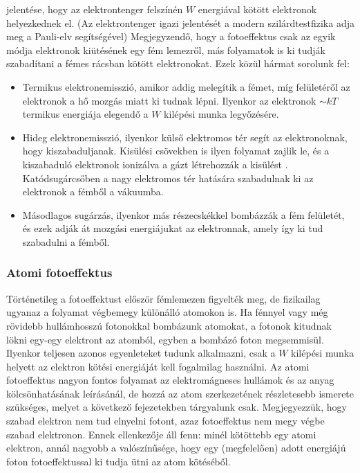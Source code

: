 \documentclass[../main.tex]{subfiles}
\begin{document}
jelentése, hogy az elektrontenger felszínén $W$ energiával kötött elektronok helyezkednek el. (Az elektrontenger igazi jelentését a modern szilárdtestfizika adja meg a Pauli-elv segítségével)
Megjegyzendő, hogy a fotoeffektus csak az egyik módja elektronok kiütésének egy fém lemezről, más folyamatok is ki tudják szabadítani a fémes rácsban kötött elektronokat. Ezek közül hármat sorolunk fel:
\begin{itemize}
    \item Termikus elektronemisszió, amikor addig melegítik a fémet, míg felületéről az elektronok a hő mozgás miatt ki tudnak lépni. Ilyenkor az elektronok $\sim kT$ termikus energiája elegendő a $W$ kilépési munka legyőzésére.
    \item Hideg elektronemisszió, ilyenkor külső elektromos tér segít az elektronoknak, hogy kiszabaduljanak. Kisülési csövekben is ilyen folyamat zajlik le, és a kiszabaduló elektronok ionizálva a gázt létrehozzák a kisülést . Katódsugárcsőben a nagy elektromos tér hatására szabadulnak ki az elektronok a fémből a vákuumba.
    \item Másodlagos sugárzás, ilyenkor más részecskékkel bombázzák a fém felületét, és ezek adják át mozgási energiájukat az elektronnak, amely így ki tud szabadulni a fémből.
\end{itemize}

\subsubsection{Atomi fotoeffektus}
Történetileg a fotoeffektust először fémlemezen figyelték meg, de fizikailag ugyanaz a folyamat végbemegy különálló atomokon is. Ha fénnyel vagy még
rövidebb hullámhosszú fotonokkal bombázunk atomokat, a fotonok kitudnak lökni egy-egy elektront az atomból, egyben a bombázó foton megsemmisül. Ilyenkor teljesen azonos egyenleteket tudunk alkalmazni, csak a $W$
kilépési munka helyett az elektron kötési energiáját kell fogalmilag használni. Az atomi fotoeffektus nagyon fontos folyamat az elektromágneses hullámok és az anyag kölcsönhatásának leírásánál, de hozzá az atom szerkezetének
részletesebb ismerete szükséges, melyet a következő fejezetekben tárgyalunk csak. Megjegyezzük, hogy szabad elektron nem tud elnyelni fotont, azaz fotoeffektus nem megy végbe szabad elektronon. Ennek ellenkezője áll fenn:
minél kötöttebb egy atomi elektron, annál nagyobb a valószínűsége, hogy egy (megfelelően) adott energiájú foton fotoeffektussal ki tudja ütni az atom kötéséből.
\end{document}
